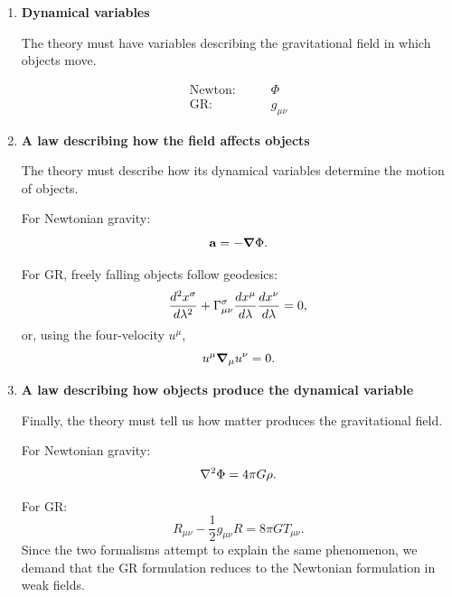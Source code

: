 		\begin{enumerate}
			\item \textbf{Dynamical variables}

			The theory must have variables describing the gravitational field in which objects move.

			\begin{align*}
				\text{Newton:} \qquad &\Phi\\
				\text{GR:} \qquad &g_{\mu\nu}
			\end{align*}

			\item \textbf{A law describing how the field affects objects}

			The theory must describe how its dynamical variables determine the motion of objects.

			For Newtonian gravity:
			\begin{equation}
				\vb{a} = -\grad\Phi.
			\end{equation}

			For GR, freely falling objects follow geodesics:
			\begin{equation}
				\dv[2]{x^\sigma}{\lambda} 
				+
				\Gamma^\sigma_{\mu\nu}
				\dv{x^\mu}{\lambda} 
				\dv{x^\nu}{\lambda} 
				=0,
			\end{equation}
			or, using the four-velocity $u^\mu$,
			\begin{equation}
				u^\mu\grad_\mu u^\nu = 0.
			\end{equation}

			\item \textbf{A law describing how objects produce the dynamical variable}

			Finally, the theory must tell us how matter produces the gravitational field.

			For Newtonian gravity:
			\begin{equation}
				\lpc\Phi = 4\pi G\rho.
			\end{equation}

			For GR:
			\begin{equation}
				R_{\mu\nu}
				-\frac{1}{2}g_{\mu\nu}R
				=
				8\pi G T_{\mu\nu}.
			\end{equation}
			Since the two formalisms attempt to explain the same phenomenon, we demand
			that the GR formulation reduces to the Newtonian formulation in weak fields.
		\end{enumerate}
		\par
